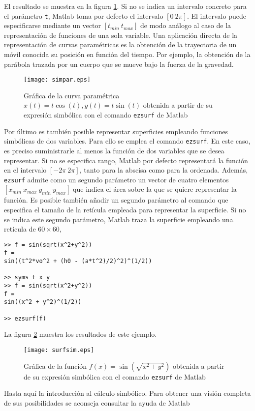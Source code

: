 El resultado se muestra en la figura \ref{fig:simpar}. Si no se  indica un intervalo concreto para el parámetro \texttt{t}, Matlab toma por defecto el intervalo $[0 \ 2\pi]$. El intervalo puede especificarse mediante un vector $[t_{min} \ t_{max}]$ de modo análogo al caso de la representación de funciones de una sola variable. Una aplicación directa de la representación de curvas paramétricas es la obtención de la trayectoria de un móvil conocida su posición en función del tiempo. Por ejemplo, la obtención de la parábola trazada por un cuerpo que se mueve bajo la fuerza de la gravedad. 

\begin{figure}[h]
\centering
\texttt{[image: simpar.eps]}
\caption{Gráfica de la curva paramétrica $x(t) = t\cos(t), y(t)= t\sin(t)$ obtenida a partir de su expresión simbólica con el comando \texttt{ezsurf} de Matlab }
\label{fig:simpar}
\end{figure}

Por último es también posible representar superficies empleando funciones simbólicas de dos variables. Para ello se emplea el comando \texttt{ezsurf}. En este caso, es preciso suministrarle al menos la función de dos variables que se desea representar. Si no se especifica rango, Matlab por defecto representará la función en el intervalo $[-2\pi \ 2\pi]$, tanto para la abscisa como para la ordenada. Además, \texttt{ezsurf} admite como un segundo parámetro un vector de cuatro elementos $[x_{min} \ x_{max} \ y_{min} \ y_{max}]$ que indica el área sobre la que se quiere representar la función. Es posible también añadir un segundo parámetro al comando que especifica el tamaño de la retícula empleada para representar la superficie. Si no se indica este segundo parámetro, Matlab traza la superficie empleando una retícula de $60 \times 60$,


\begin{verbatim}
>> f = sin(sqrt(x^2+y^2))
f =
sin((t^2*vo^2 + (h0 - (a*t^2)/2)^2)^(1/2))
 
>> syms t x y
>> f = sin(sqrt(x^2+y^2))
f =
sin((x^2 + y^2)^(1/2))
 
>> ezsurf(f)
\end{verbatim}

La figura \ref{fig:surfsim} muestra los resultados de este ejemplo. 

\begin{figure}[h]
\centering
\texttt{[image: surfsim.eps]}
\caption{Gráfica de la función $f(x) = \sin\left(\sqrt{x^2+y^2}\right)$ obtenida a partir de su expresión simbólica con el comando \texttt{ezsurf} de Matlab }
\label{fig:surfsim}
\end{figure}

Hasta aquí la introducción al cálculo simbólico. Para obtener una visión completa de sus posibilidades se aconseja consultar la ayuda de Matlab






  

  	 